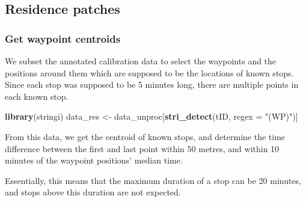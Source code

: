 \documentclass[
]{scrartcl}
\newenvironment{Shaded}{}{}
\newcommand{\DataTypeTok}[1]{\textcolor[rgb]{0.56,0.13,0.00}{#1}}
\newcommand{\KeywordTok}[1]{\textcolor[rgb]{0.00,0.44,0.13}{\textbf{#1}}}
\newcommand{\NormalTok}[1]{#1}
\newcommand{\StringTok}[1]{\textcolor[rgb]{0.25,0.44,0.63}{#1}}
\begin{document}
\hypertarget{residence-patches}{%
\subsection{Residence patches}\label{residence-patches}}

\hypertarget{get-waypoint-centroids}{%
\subsubsection{Get waypoint centroids}\label{get-waypoint-centroids}}

We subset the annotated calibration data to select the waypoints and the positions around them which are supposed to be the locations of known stops. Since each stop was supposed to be 5 minutes long, there are multiple points in each known stop.

\begin{Shaded}
\begin{Highlighting}[]
\KeywordTok{library}\NormalTok{(stringi)}
\NormalTok{data\_res <{-}}\StringTok{ }\NormalTok{data\_unproc[}\KeywordTok{stri\_detect}\NormalTok{(tID, }\DataTypeTok{regex =} \StringTok{"(WP)"}\NormalTok{)]}
\end{Highlighting}
\end{Shaded}

From this data, we get the centroid of known stops, and determine the time difference between the first and last point within 50 metres, and within 10 minutes of the waypoint positions' median time.

Essentially, this means that the maximum duration of a stop can be 20 minutes, and stops above this duration are not expected.
\end{document}
